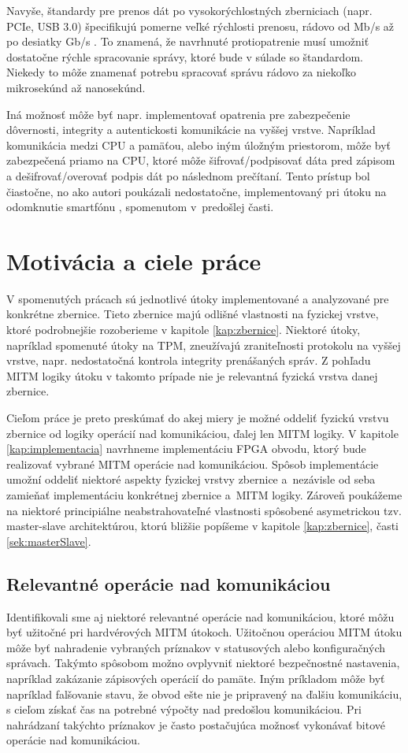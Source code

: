 Navyše, štandardy pre prenos dát po vysokorýchlostných zberniciach (napr. PCIe, USB 3.0) špecifikujú pomerne veľké rýchlosti prenosu, rádovo od Mb/s až po desiatky Gb/s \cite{pcieSpec, usbSpec}. To znamená, že navrhnuté protiopatrenie musí umožniť dostatočne rýchle spracovanie správy, ktoré bude v súlade so štandardom. Niekedy to môže znamenať potrebu spracovať správu rádovo za niekoľko mikrosekúnd až nanosekúnd.

Iná možnosť môže byť napr. implementovať opatrenia pre zabezpečenie dôvernosti, integrity a autentickosti komunikácie na vyššej vrstve. Napríklad komunikácia medzi CPU a pamäťou, alebo iným úložným priestorom, môže byť zabezpečená priamo na CPU, ktoré môže šifrovať/podpisovať dáta pred zápisom a dešifrovať/overovať podpis dát po následnom prečítaní. Tento prístup bol čiastočne, no ako autori poukázali nedostatočne, implementovaný pri útoku na odomknutie smartfónu \cite{mitmSmartphone}, spomenutom v~predošlej časti.

\section{Motivácia a ciele práce}
V spomenutých prácach sú jednotlivé útoky implementované a analyzované pre konkrétne zbernice. Tieto zbernice majú odlišné vlastnosti na fyzickej vrstve, ktoré podrobnejšie rozoberieme v kapitole \ref{kap:zbernice}. Niektoré útoky, napríklad spomenuté útoky na TPM, zneužívajú zraniteľnosti protokolu na vyššej vrstve, napr. nedostatočná kontrola integrity prenášaných správ. Z pohľadu MITM logiky útoku v takomto prípade nie je relevantná fyzická vrstva danej zbernice.

Cieľom práce je preto preskúmať do akej miery je možné oddeliť fyzickú vrstvu zbernice od logiky operácií nad komunikáciou, ďalej len MITM logiky. V kapitole \ref{kap:implementacia} navrhneme implementáciu FPGA obvodu, ktorý bude realizovať vybrané MITM operácie nad komunikáciou. Spôsob implementácie umožní oddeliť niektoré aspekty fyzickej vrstvy zbernice a~nezávisle od seba zamieňať implementáciu konkrétnej zbernice a~MITM logiky. Zároveň poukážeme na niektoré principiálne neabstrahovateľné vlastnosti spôsobené asymetrickou tzv. master-slave architektúrou, ktorú bližšie popíšeme v kapitole \ref{kap:zbernice}, časti \ref{sek:masterSlave}.

\subsection{Relevantné operácie nad komunikáciou}
Identifikovali sme aj niektoré relevantné operácie nad komunikáciou, ktoré môžu byť užitočné pri hardvérových MITM útokoch. Užitočnou operáciou MITM útoku môže byť nahradenie vybraných príznakov v statusových alebo konfiguračných správach. Takýmto spôsobom možno ovplyvniť niektoré bezpečnostné nastavenia, napríklad zakázanie zápisových operácií do pamäte. Iným príkladom môže byť napríklad falšovanie stavu, že obvod ešte nie je pripravený na ďalšiu komunikáciu, s cieľom získať čas na potrebné výpočty nad predošlou komunikáciou. Pri nahrádzaní takýchto príznakov je často postačujúca možnosť vykonávať bitové operácie nad komunikáciou.


